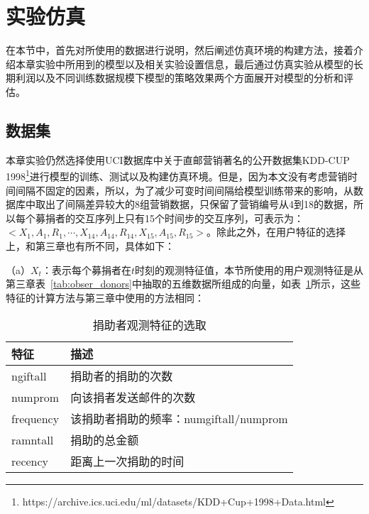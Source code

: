 \section{实验仿真}
在本节中，首先对所使用的数据进行说明，然后阐述仿真环境的构建方法，接着介绍本章实验中所用到的模型以及相关实验设置信息，最后通过仿真实验从模型的长期利润以及不同训练数据规模下模型的策略效果两个方面展开对模型的分析和评估。

\subsection{数据集}
本章实验仍然选择使用UCI数据库中关于直邮营销著名的公开数据集KDD-CUP 1998\footnote{https://archive.ics.uci.edu/ml/datasets/KDD+Cup+1998+Data.html}进行模型的训练、测试以及构建仿真环境。但是，因为本文没有考虑营销时间间隔不固定的因素，所以，为了减少可变时间间隔给模型训练带来的影响，从数据库中取出了间隔差异较大的8组营销数据，只保留了营销编号从4到18的数据，所以每个募捐者的交互序列上只有15个时间步的交互序列，可表示为：$<X_{1},A_{1},R_{1},\cdots,X_{14},A_{14},R_{14},X_{15},A_{15},R_{15}>$。除此之外，在用户特征的选择上，和第三章也有所不同，具体如下：


（a）$X_{t}$：表示每个募捐者在$t$时刻的观测特征值，本节所使用的用户观测特征是从第三章表~\ref{tab:obser_donors}中抽取的五维数据所组成的向量，如表~\ref{tab:obser_donors4}所示，这些特征的计算方法与第三章中使用的方法相同：
\begin{table}[htbp]
  \centering
  \caption{捐助者观测特征的选取}
  \label{tab:obser_donors4}
  \begin{tabular}{ll}
    \toprule
      特征 & 描述 \\
    \midrule
      ngiftall & 捐助者的捐助的次数 \\
      numprom & 向该捐者发送邮件的次数 \\
      frequency & 该捐助者捐助的频率：numgiftall/numprom\\
      ramntall & 捐助的总金额 \\
      recency & 距离上一次捐助的时间 \\
    \bottomrule
  \end{tabular}
\end{table}

